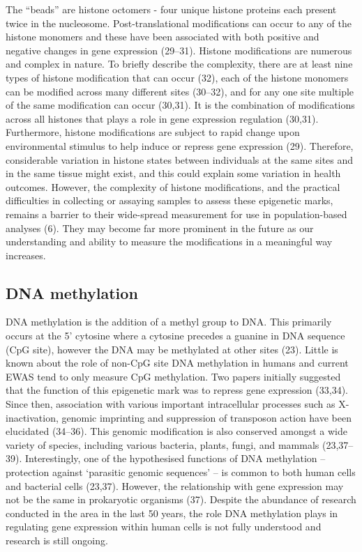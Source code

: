 \documentclass[11pt,oneside]{bristolthesis}
\begin{document}
The ``beads'' are histone octomers - four unique histone proteins each present twice in the nucleosome. Post-translational modifications can occur to any of the histone monomers and these have been associated with both positive and negative changes in gene expression (29--31). Histone modifications are numerous and complex in nature. To briefly describe the complexity, there are at least nine types of histone modification that can occur (32), each of the histone monomers can be modified across many different sites (30--32), and for any one site multiple of the same modification can occur (30,31). It is the combination of modifications across all histones that plays a role in gene expression regulation (30,31). Furthermore, histone modifications are subject to rapid change upon environmental stimulus to help induce or repress gene expression (29). Therefore, considerable variation in histone states between individuals at the same sites and in the same tissue might exist, and this could explain some variation in health outcomes. However, the complexity of histone modifications, and the practical difficulties in collecting or assaying samples to assess these epigenetic marks, remains a barrier to their wide-spread measurement for use in population-based analyses (6). They may become far more prominent in the future as our understanding and ability to measure the modifications in a meaningful way increases.

\hypertarget{dna-methylation}{%
\subsection{DNA methylation}\label{dna-methylation}}

DNA methylation is the addition of a methyl group to DNA. This primarily occurs at the 5' cytosine where a cytosine precedes a guanine in DNA sequence (CpG site), however the DNA may be methylated at other sites (23). Little is known about the role of non-CpG site DNA methylation in humans and current EWAS tend to only measure CpG methylation. Two papers initially suggested that the function of this epigenetic mark was to repress gene expression (33,34). Since then, association with various important intracellular processes such as X-inactivation, genomic imprinting and suppression of transposon action have been elucidated (34--36). This genomic modification is also conserved amongst a wide variety of species, including various bacteria, plants, fungi, and mammals (23,37--39). Interestingly, one of the hypothesised functions of DNA methylation -- protection against `parasitic genomic sequences' -- is common to both human cells and bacterial cells (23,37). However, the relationship with gene expression may not be the same in prokaryotic organisms (37). Despite the abundance of research conducted in the area in the last 50 years, the role DNA methylation plays in regulating gene expression within human cells is not fully understood and research is still ongoing.
\end{document}
